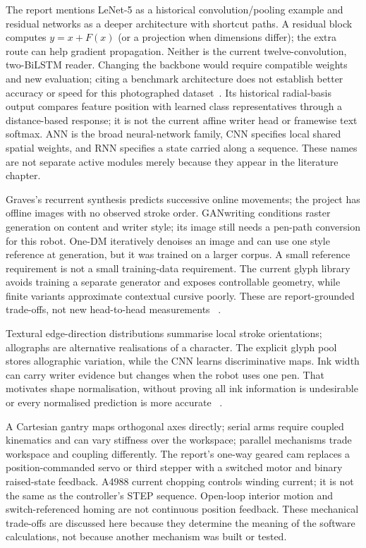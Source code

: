 The report mentions LeNet-5 as a historical convolution/pooling example and
residual networks as a deeper architecture with shortcut paths. A residual
block computes $y=x+F(x)$ (or a projection when dimensions differ); the extra
route can help gradient propagation. Neither is the current twelve-convolution,
two-BiLSTM reader. Changing the backbone would require compatible weights and
new evaluation; citing a benchmark architecture does not establish better
accuracy or speed for this photographed dataset~\cite{lenet1998,resnet2016}.
Its historical radial-basis output compares feature position with learned
class representatives through a distance-based response; it is not the current
affine writer head or framewise text softmax. ANN is the broad neural-network
family, CNN specifies local shared spatial weights, and RNN specifies a state
carried along a sequence. These names are not separate active modules merely
because they appear in the literature chapter.

Graves's recurrent synthesis predicts successive online movements; the project
has offline images with no observed stroke order. GANwriting conditions raster
generation on content and writer style; its image still needs a pen-path
conversion for this robot. One-DM iteratively denoises an image and can use one
style reference at generation, but it was trained on a larger corpus. A small
reference requirement is not a small training-data requirement. The current
glyph library avoids training a separate generator and exposes controllable
geometry, while finite variants approximate contextual cursive poorly. These
are report-grounded trade-offs, not new head-to-head measurements
~\cite{gravesgenerate,ganwriting,onedm,haines2016}.

Textural edge-direction distributions summarise local stroke orientations;
allographs are alternative realisations of a character. The explicit glyph
pool stores allographic variation, while the CNN learns discriminative maps.
Ink width can carry writer evidence but changes when the robot uses one pen.
That motivates shape normalisation, without proving all ink information is
undesirable or every normalised prediction is more accurate
~\cite{bulacu2007,brink2012}.

A Cartesian gantry maps orthogonal axes directly; serial arms require coupled
kinematics and can vary stiffness over the workspace; parallel mechanisms
trade workspace and coupling differently. The report's one-way geared cam
replaces a position-commanded servo or third stepper with a switched motor and
binary raised-state feedback. A4988 current chopping controls winding current;
it is not the same as the controller's STEP sequence. Open-loop interior motion
and switch-referenced homing are not continuous position feedback. These
mechanical trade-offs are discussed here because they determine the meaning of
the software calculations, not because another mechanism was built or tested.

